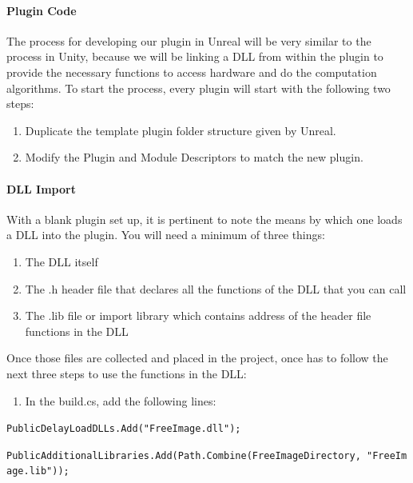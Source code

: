 \documentclass[12pt]{article}
\providecommand{\tightlist}{%
  \setlength{\itemsep}{0pt}\setlength{\parskip}{0pt}}
\begin{document}
\paragraph{Plugin Code}\label{plugin-code}

The process for developing our plugin in Unreal will be very similar to
the process in Unity, because we will be linking a DLL from within the
plugin to provide the necessary functions to access hardware and do the
computation algorithms. To start the process, every plugin will start
with the following two steps:

\begin{enumerate}
\def\labelenumi{\arabic{enumi}.}
\tightlist
\item
  Duplicate the template plugin folder structure given by Unreal.
\item
  Modify the Plugin and Module Descriptors to match the new plugin.
\end{enumerate}

\paragraph{DLL Import}\label{dll-import}

With a blank plugin set up, it is pertinent to note the means by which
one loads a DLL into the plugin. You will need a minimum of three
things:

\begin{enumerate}
\def\labelenumi{\arabic{enumi}.}
\tightlist
\item
  The DLL itself
\item
  The .h header file that declares all the functions of the DLL that you
  can call
\item
  The .lib file or import library which contains address of the header
  file functions in the DLL
\end{enumerate}

Once those files are collected and placed in the project, once has to
follow the next three steps to use the functions in the DLL:

\begin{enumerate}
\def\labelenumi{\arabic{enumi}.}
\tightlist
\item
  In the build.cs, add the following lines:
\end{enumerate}

\texttt{PublicDelayLoadDLLs.Add("FreeImage.dll");}

\texttt{PublicAdditionalLibraries.Add(Path.Combine(FreeImageDirectory,\ "FreeImage.lib"));}
\end{document}

